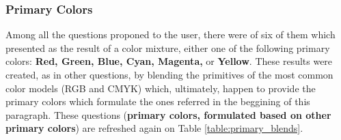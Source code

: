 \subsubsection{Primary Colors}
\label{subsubsec:primarycolors}
%
Among all the questions proponed to the user, there were of six of them which presented as the result of a color mixture, either one of the following primary colors: \textbf{Red, Green, Blue, Cyan, Magenta,}
or \textbf{Yellow}. These results were created, as in other questions, by blending the primitives of the most common color models (RGB and CMYK) which, ultimately, happen to provide the primary colors which
formulate the ones referred in the beggining of this paragraph. These questions (\textbf{primary colors, formulated based on other primary colors}) are refreshed again on Table \ref{table:primary_blends}. \par
%
